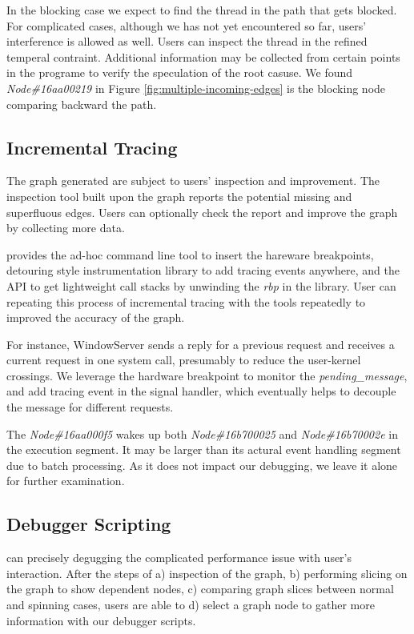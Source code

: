 \begin{itemize}
In the blocking case we expect to find the thread in the path that gets blocked.
For complicated cases, although we has not yet encountered so far, users' interference
is allowed as well. Users can inspect the thread in the refined temperal contraint.
Additional information may be collected from certain points in the programe to
verify the speculation of the root casuse.
We found \textit{Node\#16aa00219} in Figure \ref{fig:multiple-incoming-edges} is the blocking node
comparing backward the path.
\end{itemize}

\subsection{Incremental Tracing}
The graph generated are subject to users' inspection and improvement.
The inspection tool built upon the graph reports the potential missing
and superfluous edges.
Users can optionally check the report and improve the graph
by collecting more data.

\xxx provides the ad-hoc command line tool to insert the hareware breakpoints,
detouring style instrumentation library to add tracing events anywhere,
and the API to get lightweight call stacks by unwinding the \emph{rbp} in the library.
User can repeating this process of incremental tracing with the tools
repeatedly to improved the accuracy of the graph. 

For instance, WindowServer sends a reply for a previous request and receives a current
request in one system call, presumably to reduce the user-kernel crossings.
We leverage the hardware breakpoint to monitor the \textit{pending\_message}, and add tracing event
in the signal handler, which eventually helps to decouple the message for different requests.

The \textit{Node\#16aa000f5} wakes up both \textit{Node\#16b700025} and \textit{Node\#16b70002e}
in the execution segment.
It may be larger than its actural event handling segment due to batch processing.
As it does not impact our debugging, we leave it alone for further examination.

\subsection{Debugger Scripting}
\xxx can precisely degugging the complicated performance issue with user's interaction.
After the steps of
a) inspection of the graph,
b) performing slicing on the graph to show dependent nodes,
c) comparing graph slices between normal and spinning cases,
users are able to d) select a graph node to gather more information with our debugger scripts.

